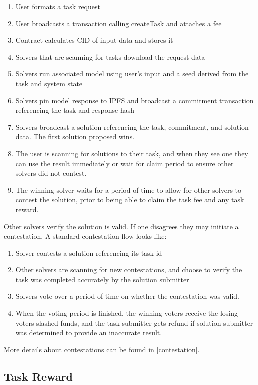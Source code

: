 \documentclass{article}
\begin{document}
\begin{enumerate}
    \item User formats a task request
    \item User broadcasts a transaction calling createTask and attaches a fee
    \item Contract calculates CID of input data and stores it
    \item Solvers that are scanning for tasks download the request data
    \item Solvers run associated model using user's input and a seed derived from the task and system state
    \item Solvers pin model response to IPFS and broadcast a commitment transaction referencing the task and response hash
    \item Solvers broadcast a solution referencing the task, commitment, and solution data. The first solution proposed wins.
    \item The user is scanning for solutions to their task, and when they see one they can use the result immediately or wait for claim period to ensure other solvers did not contest.
    \item The winning solver waits for a period of time to allow for other solvers to contest the solution, prior to being able to claim the task fee and any task reward.
\end{enumerate}

Other solvers verify the solution is valid. If one disagrees they may initiate a contestation. A standard contestation flow looks like:

\begin{enumerate}
    \item Solver contests a solution referencing its task id
    \item Other solvers are scanning for new contestations, and choose to verify the task was completed accurately by the solution submitter
    \item Solvers vote over a period of time on whether the contestation was valid.
    \item When the voting period is finished, the winning voters receive the losing voters slashed funds, and the task submitter gets refund if solution submitter was determined to provide an inaccurate result.
\end{enumerate}

More details about contestations can be found in \ref{contestation}.

\subsection{Task Reward} \label{taskreward}
\end{document}
